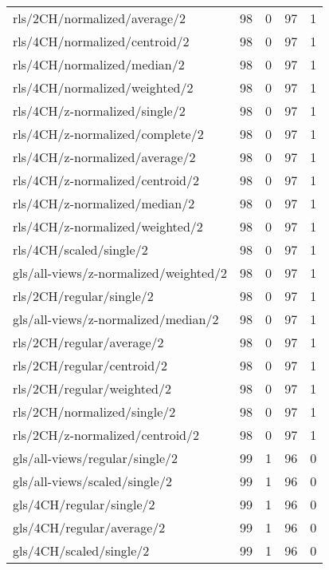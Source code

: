 \begin{longtable}{lrrrr}
    rls/2CH/normalized/average/2              & 98 &  0 & 97 &  1 \\
    rls/4CH/normalized/centroid/2             & 98 &  0 & 97 &  1 \\
    rls/4CH/normalized/median/2               & 98 &  0 & 97 &  1 \\
    rls/4CH/normalized/weighted/2             & 98 &  0 & 97 &  1 \\
    rls/4CH/z-normalized/single/2             & 98 &  0 & 97 &  1 \\
    rls/4CH/z-normalized/complete/2           & 98 &  0 & 97 &  1 \\
    rls/4CH/z-normalized/average/2            & 98 &  0 & 97 &  1 \\
    rls/4CH/z-normalized/centroid/2           & 98 &  0 & 97 &  1 \\
    rls/4CH/z-normalized/median/2             & 98 &  0 & 97 &  1 \\
    rls/4CH/z-normalized/weighted/2           & 98 &  0 & 97 &  1 \\
    rls/4CH/scaled/single/2                   & 98 &  0 & 97 &  1 \\
    gls/all-views/z-normalized/weighted/2     & 98 &  0 & 97 &  1 \\
    rls/2CH/regular/single/2                  & 98 &  0 & 97 &  1 \\
    gls/all-views/z-normalized/median/2       & 98 &  0 & 97 &  1 \\
    rls/2CH/regular/average/2                 & 98 &  0 & 97 &  1 \\
    rls/2CH/regular/centroid/2                & 98 &  0 & 97 &  1 \\
    rls/2CH/regular/weighted/2                & 98 &  0 & 97 &  1 \\
    rls/2CH/normalized/single/2               & 98 &  0 & 97 &  1 \\
    rls/2CH/z-normalized/centroid/2           & 98 &  0 & 97 &  1 \\
    gls/all-views/regular/single/2            & 99 &  1 & 96 &  0 \\
    gls/all-views/scaled/single/2             & 99 &  1 & 96 &  0 \\
    gls/4CH/regular/single/2                  & 99 &  1 & 96 &  0 \\
    gls/4CH/regular/average/2                 & 99 &  1 & 96 &  0 \\
    gls/4CH/scaled/single/2                   & 99 &  1 & 96 &  0 \\

\end{longtable}
